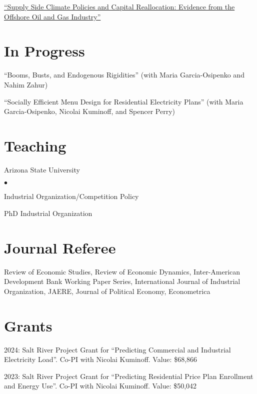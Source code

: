 \documentclass[margin,line]{res}
\newenvironment{list1}{
  \begin{list}{\ding{113}}{%
      \setlength{\itemsep}{.025in}
      \setlength{\parsep}{0in} \setlength{\parskip}{0in}
      \setlength{\topsep}{0in} \setlength{\partopsep}{0in}
      \setlength{\leftmargin}{0.17in}}}{\end{list}}
\newenvironment{list2}{
  \begin{list}{$\bullet$}{%
      \setlength{\itemsep}{0in}
      \setlength{\parsep}{0in} \setlength{\parskip}{0in}
      \setlength{\topsep}{0in} \setlength{\partopsep}{0in}
      \setlength{\leftmargin}{0.2in}}}{\end{list}}
\begin{document}
\begin{resume}
\begin{list1}
\item[] \href{https://nvreug.github.io/paper/oil_incomplete.pdf}{``Supply Side Climate Policies and Capital Reallocation:
Evidence from the Offshore Oil and Gas Industry''}

\end{list1}

\section{In Progress}
\begin{list1}
	\item[] ``Booms, Busts, and Endogenous Rigidities'' (with Maria Garcia-Osipenko and Nahim Zahur)
	\item[] ``Socially Efficient Menu Design for Residential Electricity Plans'' (with Maria Garcia-Osipenko, Nicolai Kuminoff, and Spencer Perry)
\end{list1}

\section{Teaching}
\begin{list1}
	\item[] Arizona State University
	\begin{list2}
		\item[] Industrial Organization/Competition Policy 
		\item[] PhD Industrial Organization 
	\end{list2}
\end{list1}

\section{Journal Referee}
\begin{list1}
	\item[] Review of Economic Studies, Review of Economic Dynamics, Inter-American Development Bank Working Paper Series, International Journal of Industrial Organization, JAERE, Journal of Political Economy, Econometrica
\end{list1}

\section{Grants}
\begin{list1}
	\item[] 2024: Salt River Project Grant for ``Predicting Commercial and Industrial Electricity Load''. Co-PI with Nicolai Kuminoff. Value: \$68,866
	\item[] 2023: Salt River Project Grant for ``Predicting Residential Price Plan Enrollment and Energy Use''. Co-PI with Nicolai Kuminoff. Value: \$50,042
\end{list1}


\end{resume}
\end{document}
